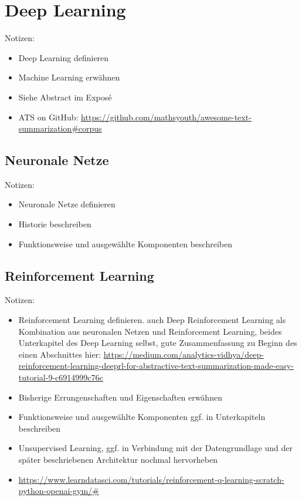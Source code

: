\chapter{Deep Learning}
\thispagestyle{fancy}
\label{chap:Deep Learning}

Notizen:
\begin{itemize}
	\item Deep Learning definieren
	\item Machine Learning erwähnen
	\item Siehe Abstract im Exposé
	\item ATS on GitHub: \url{https://github.com/mathsyouth/awesome-text-summarization#corpus}
\end{itemize}


\section{Neuronale Netze}
Notizen:
\begin{itemize}
	\item Neuronale Netze definieren
	\item Historie beschreiben
	\item Funktionsweise und ausgewählte Komponenten beschreiben
\end{itemize}


\section{Reinforcement Learning}
Notizen:
\begin{itemize}
	\item Reinforcement Learning definieren. auch Deep Reinforcement Learning als Kombination aus neuronalen Netzen und Reinforcement Learning, beides Unterkapitel des Deep Learning selbst, gute Zusammenfassung zu Beginn des einen Abschnittes hier: \url{https://medium.com/analytics-vidhya/deep-reinforcement-learning-deeprl-for-abstractive-text-summarization-made-easy-tutorial-9-c6914999c76c}
	\item Bisherige Errungenschaften und Eigenschaften erwähnen
	\item Funktionsweise und ausgewählte Komponenten ggf. in Unterkapiteln beschreiben
	\item Unsupervised Learning, ggf. in Verbindung mit der Datengrundlage und der später beschriebenen Architektur nochmal hervorheben
	\item \url{https://www.learndatasci.com/tutorials/reinforcement-q-learning-scratch-python-openai-gym/#}
\end{itemize}


